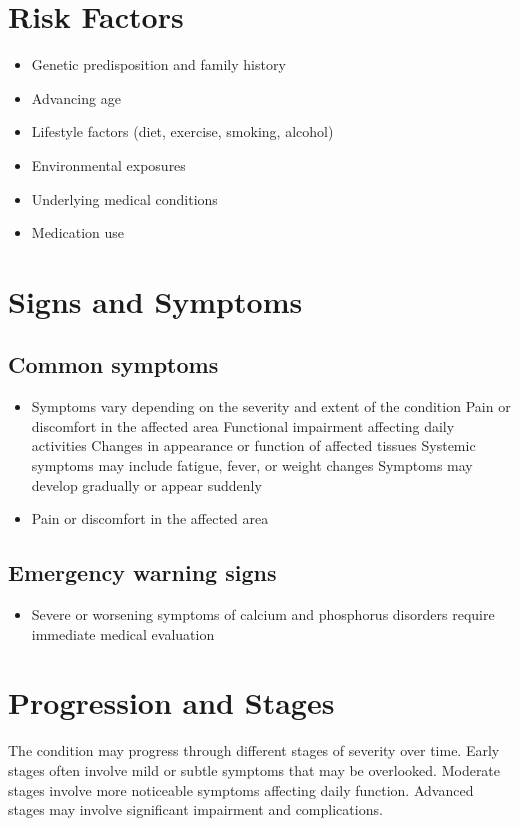 \section{Risk Factors}


\begin{itemize}[noitemsep]
  \item Genetic predisposition and family history
  \item Advancing age
  \item Lifestyle factors (diet, exercise, smoking, alcohol)
  \item Environmental exposures
  \item Underlying medical conditions
  \item Medication use
\end{itemize}
\section{Signs and Symptoms}

\subsection{Common symptoms}
\begin{itemize}[noitemsep]
  \item Symptoms vary depending on the severity and extent of the condition Pain or discomfort in the affected area Functional impairment affecting daily activities Changes in appearance or function of affected tissues Systemic symptoms may include fatigue, fever, or weight changes Symptoms may develop gradually or appear suddenly
  \item Pain or discomfort in the affected area
  \end{itemize}

\subsection{Emergency warning signs}
\begin{itemize}[noitemsep]
  \item Severe or worsening symptoms of calcium and phosphorus disorders require immediate medical evaluation
\end{itemize}
\section{Progression and Stages}
The condition may progress through different stages of severity over time. Early stages often involve mild or subtle symptoms that may be overlooked. Moderate stages involve more noticeable symptoms affecting daily function. Advanced stages may involve significant impairment and complications.
